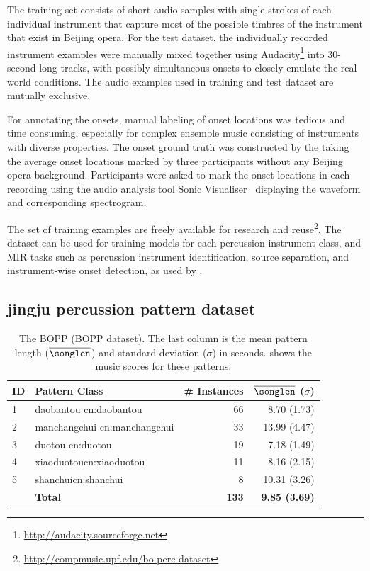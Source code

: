 The training set consists of short audio samples with single strokes of each individual instrument that capture most of the possible timbres of the instrument that exist in Beijing opera. For the test dataset, the individually recorded instrument examples were manually mixed together using Audacity\footnote{\url{http://audacity.sourceforge.net}} into 30-second long tracks, with possibly simultaneous onsets to closely emulate the real world conditions. The audio examples used in training and test dataset are mutually exclusive. 

For annotating the onsets, manual labeling of onset locations was tedious and time consuming, especially for complex ensemble music consisting of instruments with diverse properties. The onset ground truth was constructed by the taking the average onset locations marked by three participants without any Beijing opera background. Participants were asked to mark the onset locations in each recording using the audio analysis tool Sonic Visualiser~\cite{cannam:10:sv} displaying the waveform and corresponding spectrogram. 

The set of training examples are freely available for research and reuse\footnote{\url{http://compmusic.upf.edu/bo-perc-dataset}}. The dataset can be used for training models for each percussion instrument class, and \gls{MIR} tasks such as percussion instrument identification, source separation, and instrument-wise onset detection, as used by . 
\subsection{\Gls{jingju} percussion pattern dataset}\label{sec:dataset:bopp}
\begin{table}
\centering
\begin{tabular}{@{}llrr@{}}
\toprule 
ID & Pattern Class & \# Instances & $\overline{\songlen}$ ($\sigma$)\tabularnewline \midrule
1 & \gls{daobantou} \gls{cn:daobantou} & 66 & 8.70 (1.73)\tabularnewline 
2 & \gls{manchangchui} \gls{cn:manchangchui}& 33 & 13.99 (4.47)\tabularnewline 
3 & \gls{duotou} \gls{cn:duotou} & 19 & 7.18 (1.49)\tabularnewline 
4 & \gls{xiaoduotou}\gls{cn:xiaoduotou}& 11 & 8.16 (2.15) \tabularnewline 
5 & \gls{shanchui}\gls{cn:shanchui} & 8 & 10.31 (3.26)\tabularnewline \midrule
& \textbf{Total} & \textbf{133} & \textbf{9.85 (3.69)}\tabularnewline \bottomrule
\end{tabular}
\caption[The \gls{jingju} percussion pattern dataset]{The \acrlong{BOPP} (\acrshort{BOPP} dataset). The last column is the mean pattern length ($\overline{\songlen}$) and standard deviation ($\sigma$) in seconds.  shows the music scores for these patterns.}\label{tab:dataset:bopp}
\end{table}

